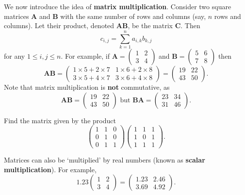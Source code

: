 We now introduce the idea of \textbf{matrix multiplication}. Consider two square matrices \textbf{A} and \textbf{B} with the same number of rows and columns (say, $n$ rows and columns). Let their product, denoted \textbf{AB}, be the matrix \textbf{C}. Then
\[
    c_{i,j} = \sum_{k=1}^n a_{i,k}b_{k,j}
\]
for any $1 \leq i, j \leq n$. For example, if $\textbf{A} = \begin{pmatrix}1 & 2\\3 & 4\end{pmatrix}$ and $\textbf{B} = \begin{pmatrix}5 & 6\\7 & 8\end{pmatrix}$ then
\[
    \textbf{AB} = \begin{pmatrix}1\times5+2\times7 & 1\times6+2\times8\\3\times5+4\times7 & 3\times6+4\times8\end{pmatrix}
    = \begin{pmatrix}19 & 22\\43 & 50\end{pmatrix}.
\]
Note that matrix multiplication is \textbf{not} commutative, as
\[
    \textbf{AB} = \begin{pmatrix}19 & 22\\43 & 50\end{pmatrix} \text{ but } \textbf{BA} = \begin{pmatrix}23 & 34\\31 & 46\end{pmatrix}.
\]

\begin{exercise}
    Find the matrix given by the product
    \[
        \begin{pmatrix}1&1&0\\0&1&0\\0&1&1\end{pmatrix}\begin{pmatrix}1&1&1\\1&0&1\\1&1&1\end{pmatrix}.
    \]
\end{exercise}

Matrices can also be `multiplied' by real numbers (known as \textbf{scalar multiplication}). For example,
\[
    1.23\begin{pmatrix}1 & 2\\3 & 4\end{pmatrix} = \begin{pmatrix}1.23 & 2.46\\3.69 & 4.92\end{pmatrix}.
\]

